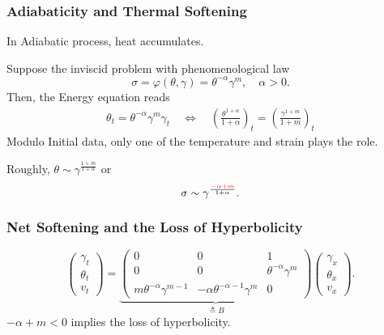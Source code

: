 \documentclass{beamer}
\def\red{\color{red}}
\def\blue{\color{blue}}
\begin{document}
\begin{frame}
 \frametitle{Adiabaticity and Thermal Softening}
  In Adiabatic process, heat accumulates.  
  
  Suppose the inviscid problem with phenomenological law
 $$\sigma=\varphi(\theta,\gamma)=\theta^{-\alpha}\gamma^m, \quad \alpha>0.$$
 Then, the Energy equation reads
 \begin{align*}
  \theta_t = \theta^{-\alpha}\gamma^m\gamma_t \quad \Longleftrightarrow \quad 
  \left(\frac{\theta^{1+\alpha}}{1+\alpha}\right)_t = \left(\frac{\gamma^{1+m}}{1+m}\right)_t
 \end{align*}
 Modulo Initial data, only one of the temperature and strain plays the role.
 
 Roughly, $\theta\sim \gamma^{\frac{1+m}{1+\alpha}}$ or
 $$\sigma \sim \gamma^{\frac{\red-\alpha+m}{1+\alpha}}.$$
 \vfill
\end{frame}

\begin{frame}
 \frametitle{Net Softening and the Loss of Hyperbolicity}
\begin{equation} \label{eq:transport}
 \begin{pmatrix} \gamma_t \\ \theta_t \\ v_t \end{pmatrix} = \underbrace{
 \begin{pmatrix}
  0 & 0 & 1\\
  0 & 0 & \theta^{-\alpha}\gamma^m \\
  m\theta^{-\alpha}\gamma^{m-1} & -\alpha\theta^{-\alpha-1}\gamma^m & 0\end{pmatrix}}_\text{$\triangleq B$}
  \begin{pmatrix} \gamma_x \\ \theta_x \\ v_x \end{pmatrix}. 
\end{equation}
\vfill
$-\alpha+m<0$ implies the loss of hyperbolicity.
\end{frame}
\end{document}
